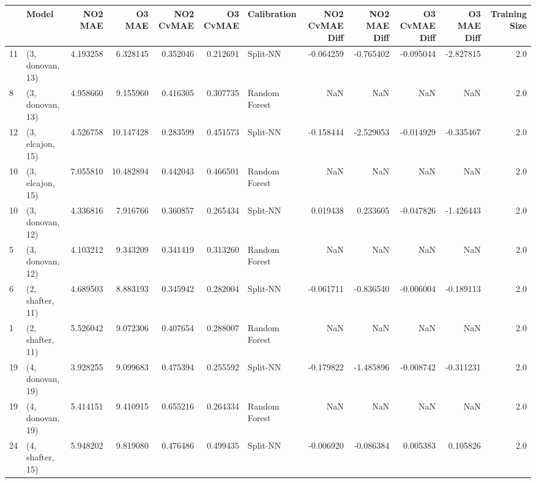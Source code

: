 \begin{tabular}{llrrrrlrrrrr}
\toprule
{} &             Model &   NO2 MAE &     O3 MAE &  NO2 CvMAE &  O3 CvMAE &    Calibration &  NO2 CvMAE Diff &  NO2 MAE Diff &  O3 CvMAE Diff &  O3 MAE Diff &  Training Size \\
\midrule
11 &  (3, donovan, 13) &  4.193258 &   6.328145 &   0.352046 &  0.212691 &       Split-NN &       -0.064259 &     -0.765402 &      -0.095044 &    -2.827815 &            2.0 \\
8  &  (3, donovan, 13) &  4.958660 &   9.155960 &   0.416305 &  0.307735 &  Random Forest &             NaN &           NaN &            NaN &          NaN &            2.0 \\
12 &  (3, elcajon, 15) &  4.526758 &  10.147428 &   0.283599 &  0.451573 &       Split-NN &       -0.158444 &     -2.529053 &      -0.014929 &    -0.335467 &            2.0 \\
10 &  (3, elcajon, 15) &  7.055810 &  10.482894 &   0.442043 &  0.466501 &  Random Forest &             NaN &           NaN &            NaN &          NaN &            2.0 \\
10 &  (3, donovan, 12) &  4.336816 &   7.916766 &   0.360857 &  0.265434 &       Split-NN &        0.019438 &      0.233605 &      -0.047826 &    -1.426443 &            2.0 \\
5  &  (3, donovan, 12) &  4.103212 &   9.343209 &   0.341419 &  0.313260 &  Random Forest &             NaN &           NaN &            NaN &          NaN &            2.0 \\
6  &  (2, shafter, 11) &  4.689503 &   8.883193 &   0.345942 &  0.282004 &       Split-NN &       -0.061711 &     -0.836540 &      -0.006004 &    -0.189113 &            2.0 \\
1  &  (2, shafter, 11) &  5.526042 &   9.072306 &   0.407654 &  0.288007 &  Random Forest &             NaN &           NaN &            NaN &          NaN &            2.0 \\
19 &  (4, donovan, 19) &  3.928255 &   9.099683 &   0.475394 &  0.255592 &       Split-NN &       -0.179822 &     -1.485896 &      -0.008742 &    -0.311231 &            2.0 \\
19 &  (4, donovan, 19) &  5.414151 &   9.410915 &   0.655216 &  0.264334 &  Random Forest &             NaN &           NaN &            NaN &          NaN &            2.0 \\
24 &  (4, shafter, 15) &  5.948202 &   9.819080 &   0.476486 &  0.499435 &       Split-NN &       -0.006920 &     -0.086384 &       0.005383 &     0.105826 &            2.0 \\

\end{tabular}
